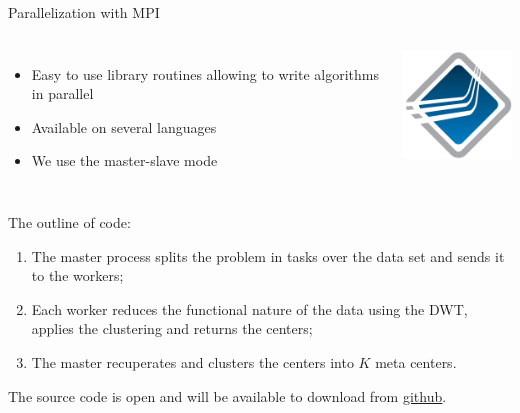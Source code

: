 \documentclass[xcolor=dvipsnames, smaller]{beamer}
\begin{document}
\begin{frame}{Parallelization with MPI}

\begin{columns}
\begin{itemize}
 \item Easy to use library routines allowing to write algorithms in parallel
 \item Available on several languages 
 \item We use the master-slave mode
\end{itemize}

\includegraphics[width=\textwidth]{./pics/open-mpi-logo.png} 
\end{columns}

\vfill

\begin{block}{The outline of code:}
\begin{enumerate}
  \item The master process splits the problem in tasks over the data set and sends it to the workers;
  \item Each worker reduces the functional nature of the data using the DWT, applies the clustering and returns the centers;
  \item The master recuperates and clusters the centers into $K$ meta centers. 
\end{enumerate}
\end{block}

The source code is open and will be available to download from 
\href{https://github.com/}{github}.

\end{frame}
\end{document}
